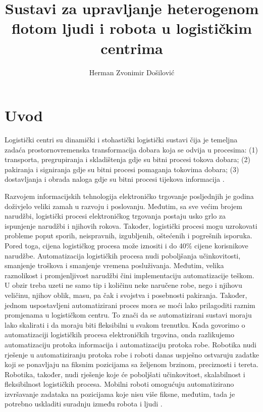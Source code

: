 \documentclass[times, utf8, seminar]{fer}
\begin{document}


\title{
    Sustavi za upravljanje heterogenom flotom ljudi i robota u logističkim centrima
}

\author{Herman Zvonimir Došilović}

\maketitle

\tableofcontents

\chapter{Uvod}
Logistički centri su dinamički i stohastički logistički sustavi
čija je temeljna zadaća prostornovremenska transformacija
dobara koja se odvija u procesima: (1) transporta, pregrupiranja i skladištenja gdje
su bitni procesi tokova dobara; (2) pakiranja i signiranja gdje su bitni procesi
pomaganja tokovima dobara; (3) dostavljanja i obrada naloga gdje su bitni procesi
tijekova informacija \citep{Paladin, buntak2012medjusobni}.

Razvojem informacijskih tehnologija elektroničko trgovanje 
 posljednjih je godina
doživjelo veliki zamah u razvoju i poslovanju. Međutim, sa sve većim brojem narudžbi,
logistički procesi elektroničkog trgovanja postaju usko grlo
za ispunjenje narudžbi i njihovih rokova. Također, logistički procesi mogu uzrokovati
probleme poput sporih, neispravnih, izgubljenih, oštećenih i pogrešnih isporuka.
Pored toga, cijena logističkog procesa može iznositi
i do 40\% cijene korisnikove narudžbe.
Automatizacija logističkih procesa nudi poboljšanja učinkovitosti, smanjenje troškova
i smanjenje vremena posluživanja. Međutim, velika raznolikost i promjenljivost
narudžbi čini implementaciju automatizacije teškom. U obzir treba uzeti
ne samo tip i količinu neke naručene robe, nego i njihovu veličinu, njihov
oblik, masu, pa čak i svojstva i posebnosti pakiranja. Također, jednom
uspostavljeni automatizirani proces mora se moći lako prilagoditi
raznim promjenama u logističkom centru. To znači da se automatizirani sustavi
moraju lako skalirati i da moraju biti fleksibilni u svakom trenutku.
Kada govorimo o automatizaciji logističkih procesa elektroničkih trgovina, onda
razlikujemo automatizaciju protoka informacija i automatizaciju protoka robe.
Robotika nudi rješenje u automatiziranju protoka robe i roboti danas uspješno
ostvaruju zadatke koji se ponavljaju na fiksnim pozicijama sa željenom brzinom,
preciznosti i tereta. Robotika, također, nudi rješenje koje će
poboljšati učinkovitost, skalabilnost i fleksibilnost logističkih procesa.
Mobilni roboti omogućuju automatizirano izvršavanje zadataka na pozicijama
koje nisu više fiksne, međutim, tada je potrebno uskladiti suradnju između robota
i ljudi \citep{huang2015robotics}.
\end{document}

